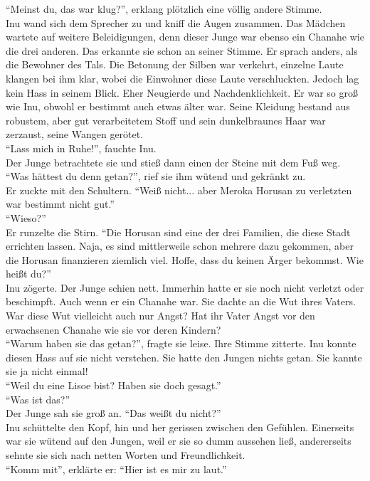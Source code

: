 ``Meinst du, das war klug?'', erklang plötzlich eine völlig andere Stimme. \\
Inu wand sich dem Sprecher zu und kniff die Augen zusammen. Das Mädchen wartete auf weitere 
Beleidigungen, denn dieser Junge war ebenso ein Chanahe wie die drei anderen. Das erkannte sie 
schon an seiner Stimme. Er sprach anders, als die Bewohner des Tals. Die Betonung der Silben war 
verkehrt, einzelne Laute klangen bei ihm klar, wobei die Einwohner diese Laute verschluckten. 
Jedoch lag kein Hass in seinem Blick. Eher Neugierde und Nachdenklichkeit. Er war so groß wie Inu, 
obwohl er bestimmt auch etwas älter war. Seine Kleidung bestand aus robustem, aber gut 
verarbeitetem 
Stoff und sein dunkelbraunes Haar war zerzaust, seine Wangen gerötet. \\
``Lass mich in Ruhe!'', fauchte Inu.\\
Der Junge betrachtete sie und stieß dann einen der Steine mit dem Fuß weg. \\
``Was hättest du denn getan?'', rief sie ihm wütend und gekränkt zu.\\
Er zuckte mit den Schultern. ``Weiß nicht... aber Meroka Horusan zu verletzten war bestimmt nicht 
gut.''\\
``Wieso?''\\
Er runzelte die Stirn. ``Die Horusan sind eine der drei Familien, die diese Stadt errichten lassen. 
Naja, es sind mittlerweile schon mehrere dazu gekommen, aber die Horusan finanzieren ziemlich viel. 
Hoffe, dass du keinen Ärger bekommst. Wie heißt du?''\\
Inu zögerte. Der Junge schien nett. Immerhin hatte er sie noch nicht verletzt oder beschimpft. Auch 
wenn er ein Chanahe war. Sie dachte an die Wut ihres Vaters. War diese Wut vielleicht auch nur 
Angst? Hat ihr Vater Angst vor den erwachsenen Chanahe wie sie vor deren Kindern? \\
``Warum haben sie das getan?'', fragte sie leise. Ihre Stimme zitterte. Inu konnte diesen Hass auf 
sie nicht verstehen. Sie hatte den Jungen nichts getan. Sie kannte sie ja nicht einmal!\\
``Weil du eine Lisoe bist? Haben sie doch gesagt.''\\
``Was ist das?''\\
Der Junge sah sie groß an. ``Das weißt du nicht?''\\
Inu schüttelte den Kopf, hin und her gerissen zwischen den Gefühlen. Einerseits war sie wütend auf 
den Jungen, weil er sie so dumm aussehen ließ, andererseits sehnte sie sich nach netten Worten und 
Freundlichkeit. \\
``Komm mit'', erklärte er: ``Hier ist es mir zu laut.''\\

